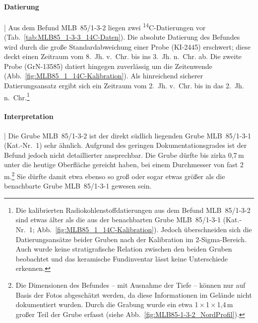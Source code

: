 \paragraph{Datierung}\hspace{-.5em}|\hspace{.5em}%
Aus dem Befund MLB~85/1-3-2 liegen zwei \textsuperscript{14}C-Datierungen vor (Tab.~\ref{tab:MLB85_1-3-3_14C-Daten}). Die absolute Datierung des Befundes wird durch die große Standardabweichung einer Probe (KI-2445) erschwert; diese deckt einen Zeitraum vom 8.~Jh. v.~Chr. bis ins 3.~Jh. n.~Chr. ab. Die zweite Probe (GrN-13585) datiert hingegen zuverlässig um die Zeitenwende (Abb.~\ref{fig:MLB85_1_14C-Kalibration}). Als hinreichend sicherer Datierungsansatz ergibt sich ein Zeitraum vom 2.~Jh. v.~Chr. bis in das 2.~Jh. n.~Chr.\footnote{Die kalibrierten Radiokohlenstoffdatierungen aus dem Befund MLB~85/1-3-2 sind etwas älter als die aus der benachbarten Grube MLB~85/1-3-1 (Kat.-Nr.~1; Abb.~\ref{fig:MLB85_1_14C-Kalibration}). Jedoch überschneiden sich die Datierungsansätze beider Gruben nach der Kalibration im 2-Sigma-Bereich. Auch wurde keine stratigrafische Relation zwischen den beiden Gruben beobachtet und das keramische Fundinventar lässt keine Unterschiede erkennen.}

\paragraph{Interpretation}\hspace{-.5em}|\hspace{.5em}%
Die Grube MLB~85/1-3-2 ist der direkt südlich liegenden Grube MLB~85/1-3-1 (Kat.-Nr.~1) sehr ähnlich. Aufgrund des geringen Dokumentationsgrades ist der Befund jedoch nicht detaillierter ansprechbar. Die Grube dürfte bis zirka 0,7\,m unter die heutige Oberfläche gereicht haben, bei einem Durchmesser von fast 2\,m.\footnote{Die Dimensionen des Befundes -- mit Ausnahme der Tiefe -- können nur auf Basis der Fotos abgeschätzt werden, da diese Informationen im Gelände nicht dokumentiert wurden. Durch die Grabung wurde ein etwa 1\,$\times$\,1\,$\times$\,1,4\,m großer Teil der Grube erfasst (siehe Abb.~\ref{fig:MLB85-1-3-2_NordProfil}).} Sie dürfte damit etwa ebenso so groß oder sogar etwas größer als die benachbarte Grube MLB~85/1-3-1 gewesen sein.